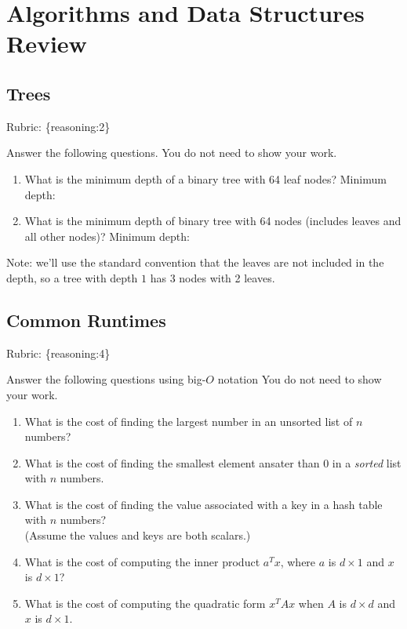 \documentclass{article}
\def\rubric#1{\gre{Rubric: \{#1\}}}{}
\def\blu#1{{\color{blu}#1}}
\def\gre#1{{\color{gre}#1}}
\def\ans#1{{\color{ans}#1}}
\begin{document}
\section{Algorithms and Data Structures Review}

\subsection{Trees}
\rubric{reasoning:2}

\blu{Answer the following questions.} You do not need to show your work.

\begin{enumerate}
\item What is the minimum depth of a binary tree with 64 leaf nodes? \ans{Minimum depth: }
\item What is the minimum depth of binary tree with 64 nodes (includes leaves and all other nodes)? \ans{Minimum depth: }
\end{enumerate}
Note: we'll use the standard convention that the leaves are not included in the depth, so a tree with depth $1$ has 3 nodes with 2 leaves.

\subsection{Common Runtimes}
\rubric{reasoning:4}

\blu{Answer the following questions using big-$O$ notation} You do not need to show your work.
\begin{enumerate}
\item What is the cost of finding the largest number in an unsorted list of $n$ numbers? \ans{}
\item What is the cost of finding the smallest element ansater than 0 in a \emph{sorted} list with $n$ numbers. \ans{}
\item What is the cost of finding the value associated with a key in a hash table with $n$ numbers? \\(Assume the values and keys are both scalars.) \ans{}
\item What is the cost of computing the inner product $a^Tx$, where $a$ is $d \times 1$ and $x$ is $d \times 1$? \ans{}
\item What is the cost of computing the quadratic form $x^TAx$ when $A$ is $d \times d$ and $x$ is $d \times 1$. \ans{}
\end{enumerate}
\end{document}
